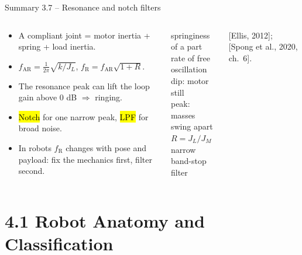 \documentclass[aspectratio=169,10pt]{beamer}
\begin{document}
\begin{frame}[t]{Summary 3.7 -- Resonance and notch filters}
\begin{columns}[T,onlytextwidth]
\begin{keybox}
\small
\begin{itemize}
\item A compliant joint = motor inertia + spring + load inertia.
\item $f_\text{AR}=\frac1{2\pi}\sqrt{k/J_L}$, $f_\text{R}=f_\text{AR}\sqrt{1+R}$.
\item The resonance peak can lift the loop gain above 0 dB $\Rightarrow$ ringing.
\item \hl{Notch} for one narrow peak, \hl{LPF} for broad noise.
\item In robots $f_\text{R}$ changes with pose and payload: fix the mechanics first, filter second.
\end{itemize}
\end{keybox}
\begin{defbox}
\small
{} springiness of a part\\
 rate of free oscillation\\
 dip: motor still\\
 peak: masses swing apart\\
 $R=J_L/J_M$\\
 narrow band-stop filter
\end{defbox}
{\scriptsize\color{mkGray} [Ellis, 2012]; [Spong et al., 2020, ch.~6].}
\end{columns}
\end{frame}

\section[4.1 Robot anatomy]{4.1 Robot Anatomy and Classification}
\end{document}
